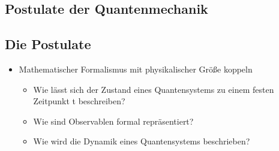 \documentclass[10pt,article,colorback,accentcolor=tud9d]{scrartcl}
\begin{document}
\begin{fleqn}
\section{Postulate der Quantenmechanik}
\subsection{Die Postulate}
  \begin{itemize}
    \item Mathematischer Formalismus mit physikalischer Größe koppeln
      \begin{itemize}
        \item Wie lässt sich der Zustand eines Quantensystems zu einem festen Zeitpunkt t beschreiben?
        \item Wie sind Observablen formal repräsentiert?
        \item Wie wird die Dynamik eines Quantensystems beschrieben?
      \end{itemize}
  \end{itemize}
  

\end{fleqn}
\end{document}
